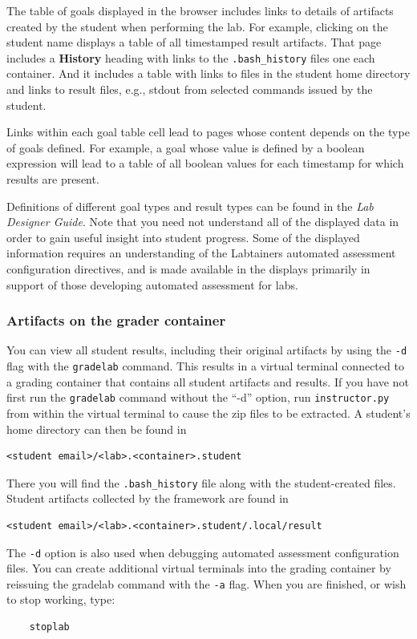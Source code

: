 \documentclass[12pt]{article}
\begin{document}
The table of goals displayed in the browser includes links to details of artifacts
created by the student when performing the lab.  For example, clicking on the student name displays a table
of all timestamped result artifacts.  That page includes a \textbf{History} heading with links to the
{\tt .bash\_history} files one each container.  And it includes a table with links to files in the student home directory
and links to result files, e.g., stdout from selected commands issued by the student. 

Links within each goal table cell lead to pages whose content depends on the type of goals defined.  For example,
a goal whose value is defined by a boolean expression will lead to a table of all boolean values for each timestamp
for which results are present.

Definitions of different goal types and result types can be found in the \textit{Lab Designer Guide}.  Note that you need
not understand all of the displayed data in order to gain useful insight into student progress.  Some of the displayed information
requires an understanding of the Labtainers automated assessment configuration directives, and is made available in the displays 
primarily in support of those developing automated assessment for labs.

\subsubsection{Artifacts on the grader container}
You can view all student results, including their original artifacts by using the {\tt -d} flag
with the {\tt gradelab} command.  This results in a virtual terminal connected to a grading
container that contains all student artifacts and results.  If you have not first run the
{\tt gradelab} command without the ``-d'' option, run {\tt instructor.py} from within the
virtual terminal to cause the zip files to be extracted.  A student's home directory can
then be found in
\begin{verbatim}
<student email>/<lab>.<container>.student
\end{verbatim}
\noindent There you will find the {\tt .bash\_history} file along with the student-created files.
Student artifacts collected by the framework are found in 
\begin{verbatim}
<student email>/<lab>.<container>.student/.local/result
\end{verbatim}

\noindent The {\tt -d} option is also used when debugging automated assessment configuration
files.  You can create additional virtual terminals into the grading container by reissuing
the gradelab command with the {\tt -a} flag.  When you are finished, or wish to stop working, type:
\begin{verbatim}
    stoplab
\end{verbatim}
\end{document}
